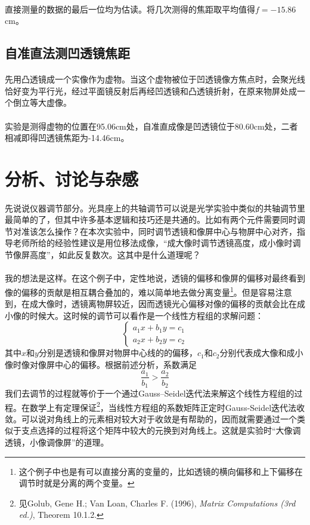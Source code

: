 \documentclass{article} %
\begin{document}
\paragraph{}
直接测量的数据的最后一位均为估读。将几次测得的焦距取平均值得$f=-15.86$cm。
\subsection{自准直法测凹透镜焦距}
\paragraph{}
先用凸透镜成一个实像作为虚物。当这个虚物被位于凹透镜像方焦点时，会聚光线恰好变为平行光，经过平面镜反射后再经凹透镜和凸透镜折射，在原来物屏处成一个倒立等大虚像。

\paragraph{}
实验是测得虚物的位置在95.06cm处，自准直成像是凹透镜位于80.60cm处，二者相减即得凹透镜焦距为-14.46cm。

\section{分析、讨论与杂感}
\paragraph{}
先说说仪器调节部分。光具座上的共轴调节可以说是光学实验中类似的共轴调节里最简单的了，但其中许多基本逻辑和技巧还是共通的。比如有两个元件需要同时调节对准该怎么操作？在本次实验中，同时调节透镜和像屏中心与物屏中心对齐，指导老师所给的经验性建议是用位移法成像，“成大像时调节透镜高度，成小像时调节像屏高度”，如此反复数次。这其中是什么道理呢？
\paragraph{}
我的想法是这样。在这个例子中，定性地说，透镜的偏移和像屏的偏移对最终看到像的偏移的贡献是相互耦合叠加的，难以简单地去做分离变量\footnote{这个例子中也是有可以直接分离的变量的，比如透镜的横向偏移和上下偏移在调节时就是分离的两个变量。}。但是容易注意到，在成大像时，透镜离物屏较近，因而透镜光心偏移对像的偏移的贡献会比在成小像的时候大。这时候的调节可以看作是一个线性方程组的求解问题：
\[
\begin{cases}	
a_1x+b_1y=c_1\\
a_2x+b_2y=c_2
\end{cases}
\]
其中$x$和$y$分别是透镜和像屏对物屏中心线的的偏移，$c_1$和$c_2$分别代表成大像和成小像时像对像屏中心的偏移。根据前述分析，系数满足
\[
\frac{a_1}{b_1}>\frac{a_2}{b_2}
\]
我们去调节的过程就等价于一个通过Gauss–Seidel迭代法来解这个线性方程组的过程。在数学上有定理保证\footnote{见Golub, Gene H.; Van Loan, Charles F. (1996), \textit{Matrix Computations (3rd ed.)}, Theorem 10.1.2.}，当线性方程组的系数矩阵正定时Gauss-Seidel迭代法收敛。可以说对角线上的元素相对较大对于收敛是有帮助的，因而就需要通过一个类似于支点选择的过程将这个矩阵中较大的元换到对角线上。这就是实验时“大像调透镜，小像调像屏”的道理。
\end{document}
